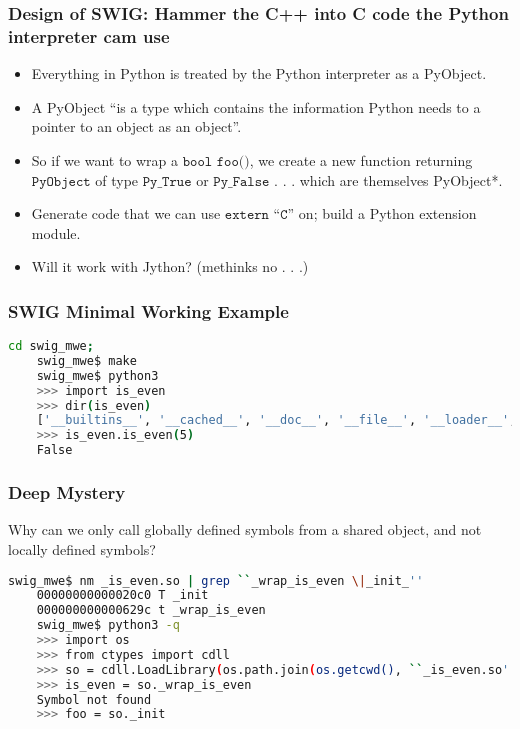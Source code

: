 \documentclass{beamer}
\begin{document}
\begin{frame}[fragile]
  \frametitle{Design of SWIG: Hammer the C++ into C code the Python interpreter cam use}
  \begin{itemize}
  \item Everything in Python is treated by the Python interpreter as a PyObject.
  \item A PyObject ``is a type which contains the information Python needs to a pointer to an object as an object''.
  \item So if we want to wrap a $\texttt{bool foo()}$, we create a new function returning $\texttt{PyObject}$ of type $\texttt{Py\_True}$ or $\texttt{Py\_False}$ . . . which are themselves PyObject*.
  \item Generate code that we can use $\texttt{extern ``C''}$ on; build a Python extension module.
  \item Will it work with Jython? (methinks no . . .)
  \end{itemize}
\end{frame}


\begin{frame}[fragile]
  \frametitle{SWIG Minimal Working Example}
  \begin{lstlisting}[language=bash]
    cd swig_mwe;
    swig_mwe$ make
    swig_mwe$ python3
    >>> import is_even
    >>> dir(is_even)
    ['__builtins__', '__cached__', '__doc__', '__file__', '__loader__', '__name__', '__package__', '__spec__', '_is_even', '_newclass', '_object', '_swig_getattr', '_swig_getattr_nondynamic', '_swig_property', '_swig_repr', '_swig_setattr', '_swig_setattr_nondynamic', 'is_even']
    >>> is_even.is_even(5)
    False
  \end{lstlisting}
\end{frame}

\begin{frame}[fragile]
  \frametitle{Deep Mystery}
  Why can we only call globally defined symbols from a shared object, and not locally defined symbols?
  \begin{lstlisting}[language=bash]
    swig_mwe$ nm _is_even.so | grep ``_wrap_is_even \|_init_''
    00000000000020c0 T _init
    000000000000629c t _wrap_is_even
    swig_mwe$ python3 -q
    >>> import os
    >>> from ctypes import cdll
    >>> so = cdll.LoadLibrary(os.path.join(os.getcwd(), ``_is_even.so'')))
    >>> is_even = so._wrap_is_even
    Symbol not found
    >>> foo = so._init
  \end{lstlisting}
\end{frame}
\end{document}
